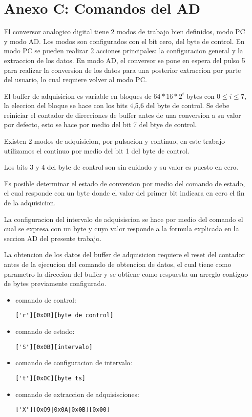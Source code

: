 \section{Anexo C: Comandos del AD}

El conversor analogico digital tiene 2 modos de trabajo bien definidos, modo PC y modo AD. 
Los modos son configurados con el bit cero, del byte de control.
En modo PC se pueden realizar 2 acciones principales: la configuracion general y la extraccion de los datos.
En modo AD, el conversor se pone en espera del pulso 5 para realizar la conversion de los datos para una posterior extraccion por parte del usuario, lo cual requiere volver al modo PC.

El buffer de adquisicion es variable en bloques de $64*16*2^{i}$ bytes con $0 \leq i \leq 7$, la eleccion
del bloque se hace con los bits 4,5,6 del byte de control.
Se debe reiniciar el contador de direcciones de buffer antes de una conversion a su valor por defecto,
esto se hace por medio del bit 7 del btye de control.

Existen 2 modos de adquisicion, por pulsacion y continuo, en este trabajo utilizamos el continuo por 
medio del bit 1 del byte de control.

Los bits 3 y 4 del byte de control son sin cuidado y su valor es puesto en cero.

Es posible determinar el estado de conversion por medio del comando de estado, el cual responde
con un byte donde el valor del primer bit indicara en cero el fin de la adquisicion.

La configuracion del intervalo de adquisiscion se hace por medio del comando el cual se expresa
con un byte y cuyo valor responde a la formula explicada en la seccion AD del presente trabajo.

La obtencion de los datos del buffer de adquisicion requiere el reset del contador antes de la 
ejecucion del comando de obtencion de datos, el cual tiene como parametro la direccion del 
buffer y se obtiene como respuesta un arreglo contiguo de bytes previamente configurado. 



\begin{itemize}
\item comando de control: \begin{verbatim}['r'][0x0B][byte de control]\end{verbatim}
\item comando de estado: \begin{verbatim}['S'][0x0B][intervalo]\end{verbatim}
\item comando de configuracion de intervalo: \begin{verbatim}['t'][0x0C][byte ts]\end{verbatim}
\item comando de extraccion de adquisisciones: \begin{verbatim}['X'][OxO9|0x0A|0x0B][0x00]\end{verbatim}
\end{itemize}

\newpage